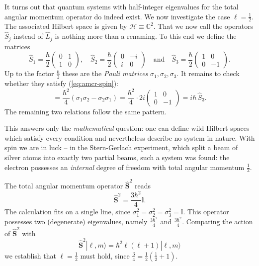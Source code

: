 It turns out that quantum systems with half-integer eigenvalues for the total angular momentum operator do indeed exist. We now investigate the case $\ell = \frac12$. The associated Hilbert space is given by $\mathcal{H} \equiv \mathbb{C}^2$. That we now call the operators $\widehat{S}_j$ instead of $\widehat{L}_j$ is nothing more than a renaming. To this end we define the matrices
\begin{equation}
	\widehat{S}_1 = \frac{\hbar}{2} \begin{pmatrix}
		0 & 1 \\ 1 & 0
	\end{pmatrix}, \quad \widehat{S}_2 = \frac{\hbar}{2} \begin{pmatrix}
		0 & -i \\ i & 0
	\end{pmatrix} \quad \text{and} \quad \widehat{S}_3 = \frac{\hbar}{2} \begin{pmatrix}
		1 & 0 \\ 0 & -1
	\end{pmatrix}.
\end{equation}
Up to the factor $\frac{\hbar}{2}$ these are the \emph{Pauli matrices} $\sigma_1,\sigma_2,\sigma_3$. It remains to check whether they satisfy (\ref{eq:amcr-spin}):
\begin{equation}
	[\widehat{S}_1,\widehat{S}_2] = \frac{\hbar^2}{4}\left(\sigma_1\sigma_2-\sigma_2\sigma_1\right) = \frac{\hbar^2}{4}\cdot 2i \begin{pmatrix}
		1 & 0 \\ 0 & -1
	\end{pmatrix} = i\hbar\, \widehat{S}_3.
\end{equation}
The remaining two relations follow the same pattern.

\begin{historical}
	This answers only the \emph{mathematical} question: one can define wild Hilbert spaces which satisfy every condition and nevertheless describe no system in nature. With spin we are in luck -- in the Stern-Gerlach experiment, which split a beam of silver atoms into exactly two partial beams, such a system was found: the electron possesses an \emph{internal} degree of freedom with total angular momentum $\frac12$.
\end{historical}

The total angular momentum operator $\widehat{\mathbf{S}}^2$ reads
\begin{equation}
	\widehat{\mathbf{S}}^2 = \frac{3\hbar^2}{4} \mathbb{I}.
\end{equation}
The calculation fits on a single line, since $\sigma_1^2 = \sigma_2^2 = \sigma_3^2 = \mathbb{I}$. This operator possesses two (degenerate) eigenvalues, namely $\frac{3\hbar^2}{4}$ and $\frac{3\hbar^2}{4}$. Comparing the action of $\widehat{\mathbf{S}}^2$ with
\begin{equation}
	\widehat{\mathbf{S}}^2|\ell,m\rangle = \hbar^2\ell(\ell+1)|\ell,m\rangle
\end{equation}
we establish that $\ell=\frac12$ must hold, since $\frac34 = \frac12\left(\frac12+1\right)$.

